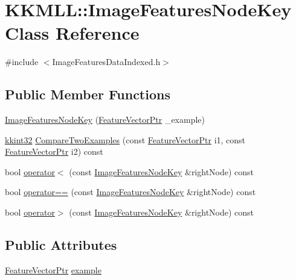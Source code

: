 \hypertarget{class_k_k_m_l_l_1_1_image_features_node_key}{}\section{K\+K\+M\+LL\+:\+:Image\+Features\+Node\+Key Class Reference}
\label{class_k_k_m_l_l_1_1_image_features_node_key}


{\ttfamily \#include $<$Image\+Features\+Data\+Indexed.\+h$>$}

\subsection*{Public Member Functions}
\begin{DoxyCompactItemize}
\item 
\hyperlink{class_k_k_m_l_l_1_1_image_features_node_key_a99330660ef9217b3e6dce3c7f029a5a0}{Image\+Features\+Node\+Key} (\hyperlink{namespace_k_k_m_l_l_a0c5df3d48f45926fbc4fee04f5e3bc04}{Feature\+Vector\+Ptr} \+\_\+example)
\item 
\hyperlink{namespace_k_k_b_a8fa4952cc84fda1de4bec1fbdd8d5b1b}{kkint32} \hyperlink{class_k_k_m_l_l_1_1_image_features_node_key_a459564000f4e01c3622dea443f42e190}{Compare\+Two\+Examples} (const \hyperlink{namespace_k_k_m_l_l_a0c5df3d48f45926fbc4fee04f5e3bc04}{Feature\+Vector\+Ptr} i1, const \hyperlink{namespace_k_k_m_l_l_a0c5df3d48f45926fbc4fee04f5e3bc04}{Feature\+Vector\+Ptr} i2) const 
\item 
bool \hyperlink{class_k_k_m_l_l_1_1_image_features_node_key_a82b81b5dfa7de85fd41f54e3b30aadda}{operator$<$} (const \hyperlink{class_k_k_m_l_l_1_1_image_features_node_key}{Image\+Features\+Node\+Key} \&right\+Node) const 
\item 
bool \hyperlink{class_k_k_m_l_l_1_1_image_features_node_key_a523aeee8c43278887b9fe7b1aa32f4db}{operator==} (const \hyperlink{class_k_k_m_l_l_1_1_image_features_node_key}{Image\+Features\+Node\+Key} \&right\+Node) const 
\item 
bool \hyperlink{class_k_k_m_l_l_1_1_image_features_node_key_a9f28c854e841024aaaeef4a249305b15}{operator$>$} (const \hyperlink{class_k_k_m_l_l_1_1_image_features_node_key}{Image\+Features\+Node\+Key} \&right\+Node) const 
\end{DoxyCompactItemize}
\subsection*{Public Attributes}
\begin{DoxyCompactItemize}
\item 
\hyperlink{namespace_k_k_m_l_l_a0c5df3d48f45926fbc4fee04f5e3bc04}{Feature\+Vector\+Ptr} \hyperlink{class_k_k_m_l_l_1_1_image_features_node_key_a5640af48690c6d775da5be786799d506}{example}
\end{DoxyCompactItemize}


